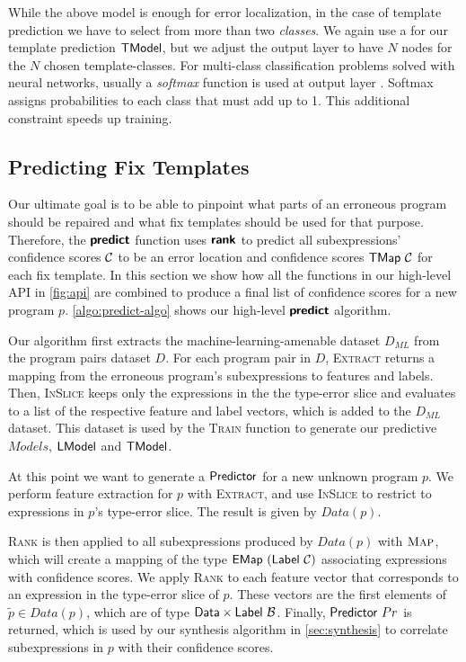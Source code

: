 While the above model is enough for error localization, in the case of template
prediction we have to select from more than two \emph{classes}. We again use a
\dnn for our template prediction $\mathsf{TModel}$, but we adjust the output layer to
have $N$ nodes for the $N$ chosen template-classes. For multi-class
classification problems solved with neural networks, usually a \emph{softmax}
function is used at output layer \citep{Goodfellow-et-al-2016,Bishop-book-2006}.
Softmax assigns probabilities to each class that must add up to 1.
This additional constraint speeds up training.



\subsection{Predicting Fix Templates}
\label{sec:templ-pred:predict}

Our ultimate goal is to be able to pinpoint what parts of an erroneous program
should be repaired and what fix templates should be used for that purpose.
Therefore, the $\bm{\mathsf{predict}}$ function uses $\bm{\mathsf{rank}}$ to predict all
subexpressions' confidence scores $\mathcal{C}$ to be an error location and confidence
scores $\mathsf{TMap}\ \mathcal{C}$ for each fix template. In this section we
show how all the functions in our high-level API in \autoref{fig:api} are
combined to produce a final list of confidence scores for a new program $p$.
\autoref{algo:predict-algo} shows our high-level $\bm{\mathsf{predict}}$ algorithm.



Our algorithm first extracts the machine-learning-amenable dataset $D_{ML}$
from the program pairs dataset $D$. For each program pair in $D$,
\textsc{Extract} returns a mapping from the erroneous program's subexpressions
to features and labels. Then, \textsc{InSlice} keeps only the expressions in
the the type-error slice and evaluates to a list of the respective feature and
label vectors, which is added to the $D_{ML}$ dataset. This dataset
is used by the \textsc{Train} function to generate our predictive $Models$, \ie
$\mathsf{LModel}$ and $\mathsf{TModel}$.

At this point we want to generate a $\mathsf{Predictor}$ for a new unknown program
$p$. We perform feature extraction for $p$ with \textsc{Extract}, and use
\textsc{InSlice} to restrict to expressions in $p$'s type-error slice.
The result is given by $Data(p)$.

\textsc{Rank} is then applied to all subexpressions produced by $Data(p)$ with
$\textsc{Map}$, which will create a mapping of the type
$\mathsf{EMap}\ (\mathsf{Label}\ \mathcal{C})$ associating expressions with confidence scores. We
apply \textsc{Rank} to each feature vector that corresponds to an expression in
the type-error slice of $p$. These vectors are the first elements of $\tilde{p}
\in Data(p)$, which are of type $\mathsf{Data} \times \mathsf{Label}\ \mathcal{B}$. Finally,
$\mathsf{Predictor}\ Pr$ is returned, which is used by our synthesis algorithm in
\autoref{sec:synthesis} to correlate subexpressions in $p$ with their confidence
scores.
